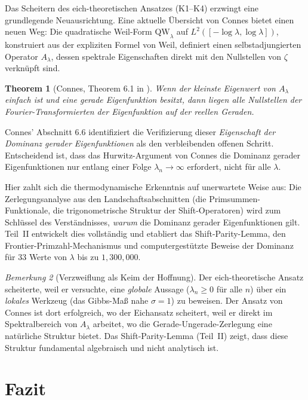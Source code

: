 \documentclass[12pt,a4paper]{article}
\newtheorem{theorem}{Theorem}[section]
\theoremstyle{definition}
\theoremstyle{remark}
\newtheorem{remark}[theorem]{Bemerkung}
\begin{document}
Das Scheitern des eich-theoretischen Ansatzes (K1--K4) erzwingt eine grundlegende Neuausrichtung. Eine aktuelle Übersicht von Connes \cite{Connes2026} bietet einen neuen Weg: Die quadratische Weil-Form $\mathrm{QW}_\lambda$ auf $L^2([-\log\lambda, \log\lambda])$, konstruiert aus der expliziten Formel von Weil, definiert einen selbstadjungierten Operator $A_\lambda$, dessen spektrale Eigenschaften direkt mit den Nullstellen von $\zeta$ verknüpft sind.

\begin{theorem}[Connes, Theorem 6.1 in \cite{Connes2026}]
Wenn der kleinste Eigenwert von $A_\lambda$ einfach ist und eine gerade Eigenfunktion besitzt, dann liegen alle Nullstellen der Fourier-Transformierten der Eigenfunktion auf der reellen Geraden.
\end{theorem}

Connes' Abschnitt 6.6 identifiziert die Verifizierung dieser \emph{Eigenschaft der Dominanz gerader Eigenfunktionen} als den verbleibenden offenen Schritt. Entscheidend ist, dass das Hurwitz-Argument von Connes die Dominanz gerader Eigenfunktionen nur entlang einer Folge $\lambda_n \to \infty$ erfordert, nicht für alle $\lambda$.

Hier zahlt sich die thermodynamische Erkenntnis auf unerwartete Weise aus: Die Zerlegungsanalyse aus den Landschaftsabschnitten (die Primsummen-Funktionale, die trigonometrische Struktur der Shift-Operatoren) wird zum Schlüssel des Verständnisses, \emph{warum} die Dominanz gerader Eigenfunktionen gilt. Teil~II entwickelt dies vollständig und etabliert das Shift-Parity-Lemma, den Frontier-Primzahl-Mechanismus und computergestützte Beweise der Dominanz für 33 Werte von $\lambda$ bis zu $1{,}300{,}000$.

\begin{remark}[Verzweiflung als Keim der Hoffnung]
Der eich-theoretische Ansatz scheiterte, weil er versuchte, eine \emph{globale} Aussage ($\lambda_n \geq 0$ für alle $n$) über ein \emph{lokales} Werkzeug (das Gibbs-Maß nahe $\sigma = 1$) zu beweisen. Der Ansatz von Connes ist dort erfolgreich, wo der Eichansatz scheitert, weil er direkt im Spektralbereich von $A_\lambda$ arbeitet, wo die Gerade-Ungerade-Zerlegung eine natürliche Struktur bietet. Das Shift-Parity-Lemma (Teil~II) zeigt, dass diese Struktur fundamental algebraisch und nicht analytisch ist.
\end{remark}


\section{Fazit}
\label{sec:conclusion}
\end{document}
